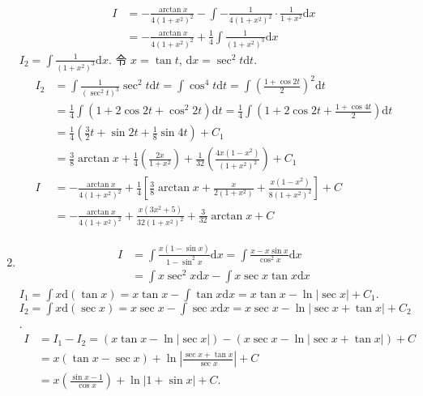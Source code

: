 \begin{solution}
\begin{enumerate}
\begin{align*}
                  I & = -\frac{\arctan x}{4(1 + x^2)^2} - \int -\frac{1}{4(1 + x^2)^2} \cdot \frac{1}{1 + x^2} \mathrm{d}x \\
                    & = -\frac{\arctan x}{4(1 + x^2)^2} + \frac{1}{4} \int \frac{1}{(1 + x^2)^3} \mathrm{d}x
              \end{align*}
              $I_2 = \int \frac{1}{(1+x^2)^3} \mathrm{d}x$. 令 $x = \tan t$, $\mathrm{d}x = \sec^2 t \mathrm{d}t$.
              \begin{align*}
                  I_2 & = \int \frac{1}{(\sec^2 t)^3} \sec^2 t \mathrm{d}t = \int \cos^4 t \mathrm{d}t = \int \left(\frac{1 + \cos 2t}{2}\right)^2 \mathrm{d}t     \\
                      & = \frac{1}{4} \int (1 + 2\cos 2t + \cos^2 2t) \mathrm{d}t = \frac{1}{4} \int \left(1 + 2\cos 2t + \frac{1 + \cos 4t}{2}\right) \mathrm{d}t \\
                      & = \frac{1}{4} \left( \frac{3}{2}t + \sin 2t + \frac{1}{8} \sin 4t \right) + C_1                                                            \\
                      & = \frac{3}{8}\arctan x + \frac{1}{4}\left(\frac{2x}{1+x^2}\right) + \frac{1}{32}\left(\frac{4x(1-x^2)}{(1+x^2)^2}\right) + C_1             \\
                  I   & = -\frac{\arctan x}{4(1+x^2)^2} + \frac{1}{4} \left[ \frac{3}{8}\arctan x + \frac{x}{2(1+x^2)} + \frac{x(1-x^2)}{8(1+x^2)^2} \right] + C \\
                      & = -\frac{\arctan x}{4(1+x^2)^2} + \frac{x(3x^2 + 5)}{32(1+x^2)^2} + \frac{3}{32} \arctan x + C
              \end{align*}

        \item \begin{align*}
                  I & = \int \frac{x(1 - \sin x)}{1 - \sin^2 x} \mathrm{d}x = \int \frac{x - x \sin x}{\cos^2 x} \mathrm{d}x \\
                    & = \int x \sec^2 x \mathrm{d}x - \int x \sec x \tan x \mathrm{d}x
              \end{align*}
              $I_1 = \int x \mathrm{d}(\tan x) = x \tan x - \int \tan x \mathrm{d}x = x \tan x - \ln|\sec x| + C_1$.
              $I_2 = \int x \mathrm{d}(\sec x) = x \sec x - \int \sec x \mathrm{d}x = x \sec x - \ln|\sec x + \tan x| + C_2$.
              \begin{align*}
                  I & = I_1 - I_2 = (x \tan x - \ln|\sec x|) - (x \sec x - \ln|\sec x + \tan x|) + C \\
                    & = x(\tan x - \sec x) + \ln\left|\frac{\sec x + \tan x}{\sec x}\right| + C      \\
                    & = x\left(\frac{\sin x - 1}{\cos x}\right) + \ln|1 + \sin x| + C.
              \end{align*}


\end{enumerate}
\end{solution}

